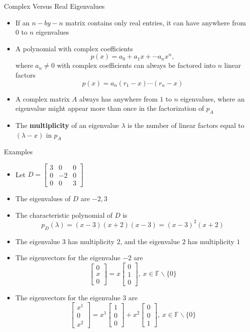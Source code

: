 \documentclass[usenames,dvipsnames,10pt]{beamer}
\newcommand\F{\mathbb{F}}
\begin{document}
\begin{frame}
  {Complex Versus Real Eigenvalues}

  \begin{itemize}
  \item If an $n-by-n$ matrix contains only real entries, it can have anywhere from $0$ to $n$ eigenvalues
  \item A polynomial with complex coefficients
    \[ p(x) = a_0 + a_1x + \cdots a_nx^n, \]
    where $a_n \ne 0$ with complex coefficients can always be factored into $n$ linear factors
    \[
      p(x) = a_n(r_1-x)\cdots(r_n-x)
    \]
  \item A complex matrix $A$ always has anywhere from $1$ to $n$ eigenvalues, where an eigenvalue might appear more than once in the factorization of $p_A$
  \item The {\bf multiplicity} of an eigenvalue $\lambda$ is the number of linear factors equal to $(\lambda-x)$ in $p_A$
  \end{itemize}
\end{frame}

\begin{frame}
  {Examples}

  \begin{itemize}
  \item Let
    $D = \begin{bmatrix} 3 & 0 & 0\\ 0 & -2 & 0\\ 0 & 0 & 3 \end{bmatrix}$
  \item The eigenvalues of $D$ are $-2, 3$
  \item The characteristic polynomial of $D$ is
    \[ p_D(\lambda) = (x-3)(x+2)(x-3) = (x-3)^2(x+2) \]
  \item The eigenvalue $3$ has multiplicity $2$, and the eigenvalue $2$ has multiplicity $1$
  \item The eigenvectors for the eigenvalue $-2$ are
    \[ \begin{bmatrix} 0 \\ x \\ 0 \end{bmatrix}=x\begin{bmatrix} 0 \\ 1 \\ 0 \end{bmatrix},\ x \in \F\backslash\{0\} \]
  \item The eigenvectors for the eigenvalue $3$ are
    \[ \begin{bmatrix} x^1 \\ 0 \\ x^2 \end{bmatrix} = x^1\begin{bmatrix} 1 \\ 0 \\ 0\end{bmatrix} + x^2\begin{bmatrix} 0 \\ 0 \\ 1 \end{bmatrix},\  x \in \F\backslash\{0\} \]
  \end{itemize}
\end{frame}
\end{document}
